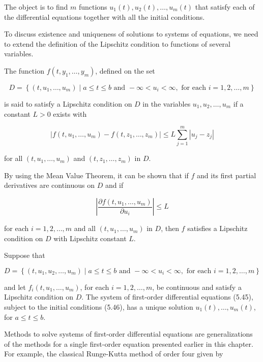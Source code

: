 The object is to find $m$ functions $u_{1}(t), u_{2}(t), \ldots, u_{m}(t)$ that satisfy each of the differential equations together with all the initial conditions.

To discuss existence and uniqueness of solutions to systems of equations, we need to extend the definition of the Lipschitz condition to functions of several variables.

\begin{definition}\label{def:hoesdedef1}
The function $f\left(t, y_{1}, \ldots, y_{m}\right)$, defined on the set

$$
D=\left\{\left(t, u_{1}, \ldots, u_{m}\right) \mid a \leq t \leq b \text { and }-\infty<u_{i}<\infty, \text { for each } i=1,2, \ldots, m\right\}
$$

is said to satisfy a Lipschitz condition on $D$ in the variables $u_{1}, u_{2}, \ldots, u_{m}$ if a constant $L>0$ exists with


\begin{equation}\label{eqn:hoesdeeq3}
\left|f\left(t, u_{1}, \ldots, u_{m}\right)-f\left(t, z_{1}, \ldots, z_{m}\right)\right| \leq L \sum_{j=1}^{m}\left|u_{j}-z_{j}\right| 
\end{equation}

for all $\left(t, u_{1}, \ldots, u_{m}\right)$ and $\left(t, z_{1}, \ldots, z_{m}\right)$ in $D$.
\end{definition}

By using the Mean Value Theorem, it can be shown that if $f$ and its first partial derivatives are continuous on $D$ and if

$$
\left|\frac{\partial f\left(t, u_{1}, \ldots, u_{m}\right)}{\partial u_{i}}\right| \leq L
$$

for each $i=1,2, \ldots, m$ and all $\left(t, u_{1}, \ldots, u_{m}\right)$ in $D$, then $f$ satisfies a Lipschitz condition on $D$ with Lipschitz constant $L$.

\begin{theorem}
Suppose that

$$
D=\left\{\left(t, u_{1}, u_{2}, \ldots, u_{m}\right) \mid a \leq t \leq b \text { and }-\infty<u_{i}<\infty, \text { for each } i=1,2, \ldots, m\right\}
$$

and let $f_{i}\left(t, u_{1}, \ldots, u_{m}\right)$, for each $i=1,2, \ldots, m$, be continuous and satisfy a Lipschitz condition on $D$. The system of first-order differential equations (5.45), subject to the initial conditions (5.46), has a unique solution $u_{1}(t), \ldots, u_{m}(t)$, for $a \leq t \leq b$.
\end{theorem}
Methods to solve systems of first-order differential equations are generalizations of the methods for a single first-order equation presented earlier in this chapter. For example, the classical Runge-Kutta method of order four given by


